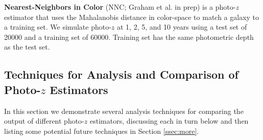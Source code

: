 \documentclass[DM,lsstdraft,toc]{lsstdoc}
\begin{document}
\textbf{Nearest-Neighbors in Color} (NNC; Graham et al. in prep) is a photo-$z$ estimator that uses the Mahalanobis distance in color-space to match a galaxy to a training set. We simulate photo-$z$ at 1, 2, 5, and 10 years using a test set of 20000 and a training set of 60000. Training set has the same photometric depth as the test set.


\subsection{Techniques for Analysis and Comparison of Photo-$z$ Estimators}\label{ssec:comp}

In this section we demonstrate several analysis techniques for comparing the output of different photo-$z$ estimators, discussing each in turn below and then listing some potential future techniques in Section \ref{ssec:more}.
\end{document}
